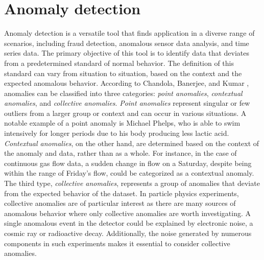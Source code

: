 \section{Anomaly detection}
Anomaly detection is a versatile tool that finds application in a diverse range of scenarios, 
including fraud detection, anomalous sensor data analysis, and time series data. The primary 
objective of this tool is to identify data that deviates from a predetermined standard of 
normal behavior. The definition of this standard can vary from situation to situation, based 
on the context and the expected anomalous behavior. According to Chandola, Banerjee, and 
Kumar \cite{anom_detec}, anomalies can be classified into three categories: \textit{point anomalies}, 
\textit{contextual anomalies}, and \textit{collective anomalies}. \textit{Point anomalies} represent singular or few 
outliers from a larger group or context and can occur in various situations. A notable example 
of a point anomaly is Michael Phelps, who is able to swim intensively for longer periods due 
to his body producing less lactic acid. \textit{Contextual anomalies}, on the other hand, are determined 
based on the context of the anomaly and data, rather than as a whole. For instance, in the 
case of continuous gas flow data, a sudden change in flow on a Saturday, despite being within 
the range of Friday's flow, could be categorized as a contextual anomaly. The third type, 
\textit{collective anomalies}, represents a group of anomalies that deviate from the expected behavior 
of the dataset. In particle physics experiments, collective anomalies are of particular 
interest as there are many sources of anomalous behavior where only collective anomalies are 
worth investigating. A single anomalous event in the detector could be explained by electronic noise, 
a cosmic ray or radioactive decay. Additionally, the noise generated by numerous components in such 
experiments makes it essential to consider collective anomalies.
